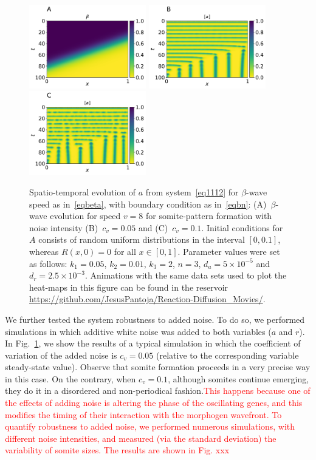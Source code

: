 \documentclass[%
 preprint,
 aip, 
 amsmath,amssymb,
]{revtex4-2}
\begin{document}
	\begin{figure}[t!]
		\centering
		\includegraphics[width=2in]{Figures/Fig05aRev.pdf}
		\includegraphics[width=2in]{Figures/Fig05bRev.pdf} 
		\includegraphics[width=2in]{Figures/Fig05cRev.pdf} 
		\caption{Spatio-temporal evolution of $a$ from system~\eqref{eq1112} for
			$\beta$-wave speed as in~\eqref{eqbeta}, with boundary condition as
			in~\eqref{eqbn}: (A)~$\beta$-wave evolution for speed $v=8$ for somite-pattern
			formation with noise intensity (B)~$c_v=0.05$ and (C)~$c_v=0.1$. Initial
			conditions for $A$ consists of random uniform distributions in the interval $[0,
			0.1]$, whereas $R(x, 0) = 0$ for all $x\in[0,1]$. Parameter values were set as
			follows: $k_1=0.05$, $k_2=0.01$, $k_3=2$, $n=3$, $d_a = 5\times10^{-5}$
			and~$d_r=2.5\times10^{-3}$. Animations with the same 
			data sets used to plot the heat-maps in this figure can be found in the 
			reservoir \url{https://github.com/JesusPantoja/Reaction-Diffusion_Movies/}.}
		\label{Fig05}
	\end{figure}
		
We further tested the system robustness to added noise. To do so, we performed simulations in which additive white noise was added to both variables ($a$ and $r$). In Fig.~\ref{Fig05}, we show the results of a typical simulation in which the coefficient of variation of the added noise is $c_v = 0.05$ (relative to the corresponding variable steady-state value). Observe that somite formation proceeds in a very precise way in this case. On the contrary, when $c_v = 0.1$, although somites continue emerging, they do it in a disordered and non-periodical fashion.\textcolor{red}{This happens because one of the effects of adding noise is altering the phase of the oscillating genes, and this modifies the timing of their interaction with the morphogen wavefront. To quantify robustness to added noise, we performed numerous simulations, with different noise intensities, and measured (via the standard deviation) the variability of somite sizes. The results are shown in Fig. xxx}
\end{document}
